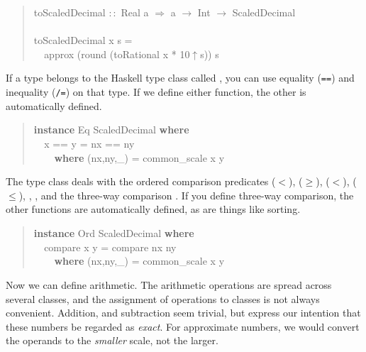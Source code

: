 \documentclass[prodmode,acmtoplas]{acmsmall}
\begin{document}
\begin{quote}
\begin{tabbing}
\sffamily toScaledDecimal $::$ Real a $\Rightarrow$ a $\rightarrow$ Int $\rightarrow$ ScaledDecimal\\
\\
\sffamily toScaledDecimal x s =\\
\verb|  |\sffamily  approx (round (toRational x * 10$\uparrow$s)) s
\end{tabbing}
\end{quote}

If a type belongs to the Haskell type class called ,
you can use equality (\verb|==|) and inequality (\verb|/=|)
on that type.  If we define either function, the other is
automatically defined.

\begin{quote}
\begin{tabbing}
\sffamily \textbf{instance} Eq ScaledDecimal \textbf{where}\\
\verb|  |\sffamily  x == y = nx == ny\\
\verb|    |\sffamily    \textbf{where} (nx,ny,\_) = common\_scale x y
\end{tabbing}
\end{quote}

The type class  deals with the ordered comparison
predicates ($<$), ($\ge$), ($<$), ($\le$),
, , and the three-way comparison .
If you define three-way comparison, the other functions are automatically
defined, as are things like sorting.

\begin{quote}
\begin{tabbing}
\sffamily \textbf{instance} Ord ScaledDecimal \textbf{where}\\
\verb|  |\sffamily  compare x y = compare nx ny\\
\verb|    |\sffamily    \textbf{where} (nx,ny,\_) = common\_scale x y
\end{tabbing}
\end{quote}

Now we can define arithmetic.  The arithmetic operations are
spread across several classes, and the assignment of operations
to classes is not always convenient.  Addition, and subtraction
seem trivial, but express our intention that these numbers be
regarded as \textit{exact}.  For approximate numbers, we would
convert the operands to the \textit{smaller} scale, not the larger.
\end{document}
